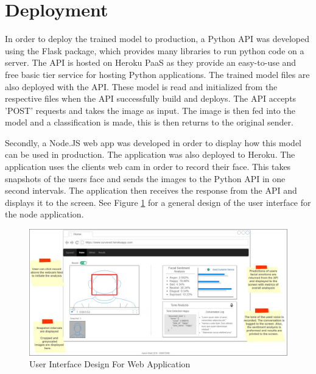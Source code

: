 \section{Deployment}
In order to deploy the trained model to production, a Python API was developed using the Flask package, which provides many libraries to run python code on a server. The API is hosted on Heroku PaaS as they provide an easy-to-use and free basic tier service for hosting Python applications. The trained model files are also deployed with the API. These model is read and initialized from the respective files when the API successfully build and deploys. The API accepts 'POST' requests and takes the image as input. The image is then fed into the model and a classification is made, this is then returns to the original sender.

Secondly, a Node.JS web app was developed in order to display how this model can be used in production. The application was also deployed to Heroku. The application uses the clients web cam in order to record their face. This takes snapshots of the users face and sends the images to the Python API in one second intervals. The application then receives the response from the API and displays it to the screen. 
See Figure \ref{ui} for a general design of the user interface for the node application.


\begin{figure}[ht]
	\begin{center}
		\advance\leftskip-3cm
		\advance\rightskip-3cm
		\includegraphics[keepaspectratio=true,scale=0.35]{__resources/mockup_annotated.jpg}
		\caption{User Interface Design For Web Application}
		\label{ui}
	\end{center}
\end{figure}


